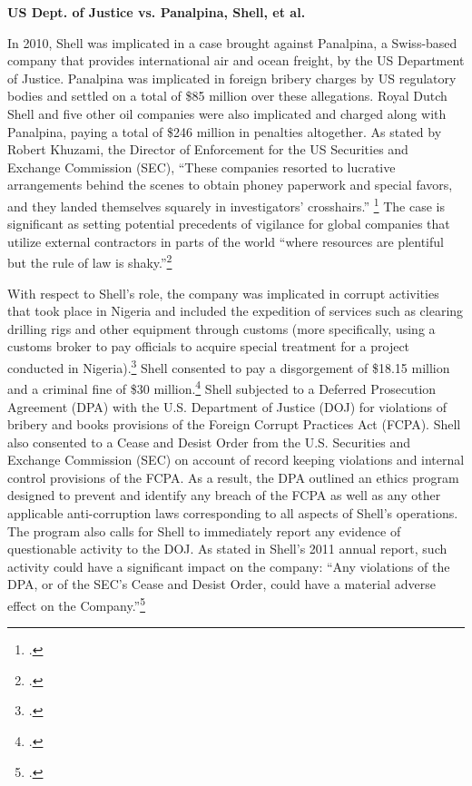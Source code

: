 \textbf{US Dept. of Justice vs. Panalpina, Shell, et al.}



In 2010, Shell was implicated in a case brought against Panalpina, a Swiss-based company that provides international air and ocean freight, by the US Department of Justice. Panalpina was implicated in foreign bribery charges by US regulatory bodies and settled on a total of \$85 million over these allegations. Royal Dutch Shell and five other oil companies were also implicated and charged along with Panalpina, paying a total of \$246 million in penalties altogether. As stated by Robert Khuzami, the Director of Enforcement for the US Securities and Exchange Commission (SEC), “These companies resorted to lucrative arrangements behind the scenes to obtain phoney paperwork and special favors, and they landed themselves squarely in investigators’ crosshairs.” \footcite[][p. 119]{KochanGoodYear_2011} The case is significant as setting potential precedents of vigilance for global companies that utilize external contractors in parts of the world ``where resources are plentiful but the rule of law is shaky.''\footcite[][]{Bribery_2010}



With respect to Shell’s role, the company was implicated in corrupt activities that took place in Nigeria and included the expedition of services such as clearing drilling rigs and other equipment through customs (more specifically, using a customs broker to pay officials to acquire special treatment for a project conducted in Nigeria).\footcite[][]{ShellBribes_2010}
Shell consented to pay a disgorgement of \$18.15 million and a criminal fine of \$30 million.\footcite[][]{SullivanCromwell_2010}
Shell subjected to a Deferred Prosecution Agreement (DPA) with the U.S. Department of Justice (DOJ) for violations of bribery and books provisions of the Foreign Corrupt Practices Act (FCPA). 
Shell also consented to a Cease and Desist Order from the U.S. Securities and Exchange Commission (SEC) on account of record keeping violations and internal control provisions of the FCPA. 
As a result, the DPA outlined an ethics program designed to prevent and identify any breach of the FCPA as well as any other applicable anti-corruption laws corresponding to all aspects of Shell’s operations. 
The program also calls for Shell to immediately report any evidence of questionable activity to the DOJ. 
As stated in Shell's 2011 annual report, such activity could have a significant impact on the company: ``Any violations of the DPA, or of the SEC’s Cease and Desist Order, could have a material adverse effect on the Company.''\footcite[][]{Shell_2011}



